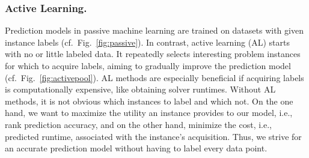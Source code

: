 \documentclass[runningheads]{llncs}
\begin{document}
\subsubsection{Active Learning.}

Prediction models in passive machine learning are trained on datasets with given instance labels (cf.~Fig.~\ref{fig:passive}).
In contrast, active learning (AL) starts with no or little labeled data.
It repeatedly selects interesting problem instances for which to acquire labels, aiming to gradually improve the prediction model (cf.~Fig.~\ref{fig:activepool}).
AL methods are especially beneficial if acquiring labels is computationally expensive, like obtaining solver runtimes.
Without AL methods, it is not obvious which instances to label and which not.
On the one hand, we want to maximize the utility an instance provides to our model, i.e., rank prediction accuracy, and on the other hand, minimize the cost, i.e., predicted runtime, associated with the instance's acquisition.
Thus, we strive for an accurate prediction model without having to label every data point.
\end{document}
